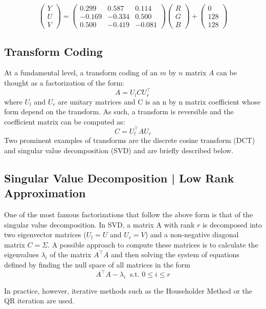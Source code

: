 \documentclass[review,onefignum,onetabnum]{siamart190516}
\begin{document}
\[
  \begin{pmatrix} Y \\ U \\ V \end{pmatrix} = 
  \begin{pmatrix}
    0.299 & 0.587 & 0.114 \\
    -0.169 & -0.334 & 0.500 \\
    0.500 & -0.419 & -0.081
  \end{pmatrix}
  \begin{pmatrix} R \\ G \\ B \end{pmatrix} + 
  \begin{pmatrix} 0 \\ 128 \\ 128 \end{pmatrix}
\]

\subsection{Transform Coding}
At a fundamental level, a transform coding of an $m$ by $n$ matrix $A$ can be thought
as a factorization of the form:
 \[
   A = U_l C U_r^\top
 \]
 where $U_l$ and $U_r$ are unitary matrices and C is an n by n matrix coefficient
 whose form depend on the transform. As such, a transform is reversible and the
 coefficient matrix can be computed as:
 \[
   C = U_l^\top A U_r
 \]
 Two prominent examples of transforms are the discrete cosine transform (DCT) and
 singular value decomposition (SVD) and are briefly described below. \cite{dapena2002hybrid}

\subsection{Singular Value Decomposition | Low Rank Approximation}
One of the most famous factorizations that follow the above form is that of the
singular value decomposition. In SVD, a matrix A with rank $r$ is decomposed into 
two eigenvector matrices ($U_l = U$ and $U_r = V$) and a non-negative diagonal
matrix $C = \Sigma$. A possible approach to compute these matrices is to calculate
the eigenvalues $\lambda_i$ of the matrix $A^\top A$ and then solving the system
of equations defined by finding the null space of all matrices in the form
\[
  A^\top A - \lambda_i~\text{ s.t. } 0 \leq i \leq r
\]

In practice, however, iterative methods such as the Householder Method or the QR 
iteration are used.\cite{trefethen1997numerical}
\end{document}
